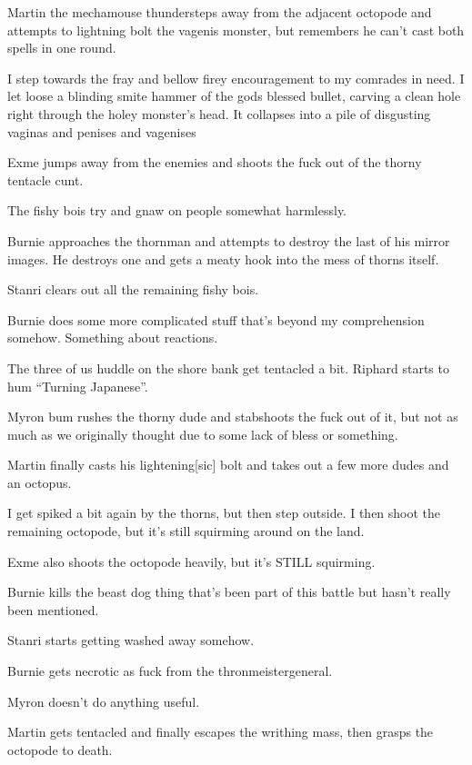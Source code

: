 Martin the mechamouse thundersteps away from the adjacent octopode and attempts to lightning bolt the vagenis monster, but remembers he can’t cast both spells in one round.\medskip

I step towards the fray and bellow firey encouragement to my comrades in need. I let loose a blinding smite hammer of the gods blessed bullet, carving a clean hole right through the holey monster’s head. It collapses into a pile of disgusting vaginas and penises and vagenises\medskip

Exme jumps away from the enemies and shoots the fuck out of the thorny tentacle cunt.\medskip

The fishy bois try and gnaw on people somewhat harmlessly.\medskip

Burnie approaches the thornman and attempts to destroy the last of his mirror images. He destroys one and gets a meaty hook into the mess of thorns itself.\medskip

Stanri clears out all the remaining fishy bois.\medskip

Burnie does some more complicated stuff that’s beyond my comprehension somehow. Something about reactions.\medskip

The three of us huddle on the shore bank get tentacled a bit. Riphard starts to hum “Turning Japanese”.\medskip

Myron bum rushes the thorny dude and stabshoots the fuck out of it, but not as much as we originally thought due to some lack of bless or something.\medskip

Martin finally casts his lightening[sic] bolt and takes out a few more dudes and an octopus.\medskip

I get spiked a bit again by the thorns, but then step outside. I then shoot the remaining octopode, but it’s still squirming around on the land.\medskip

Exme also shoots the octopode heavily, but it’s STILL squirming.\medskip

Burnie kills the beast dog thing that’s been part of this battle but hasn’t really been mentioned.\medskip

Stanri starts getting washed away somehow.\medskip

Burnie gets necrotic as fuck from the thronmeistergeneral.\medskip

Myron doesn’t do anything useful.\medskip

Martin gets tentacled and finally escapes the writhing mass, then grasps the octopode to death.\medskip

